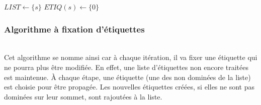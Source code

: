 \documentclass[10pt,francais]{llncs}
\begin{document}
\begin{algorithm}\label{algo-correction}
\caption{CORRECTION~: Algorithme \`a correction d'\'etiquettes}
\BlankLine
{}
\BlankLine


$LIST \leftarrow \{s\}$\;
$ETIQ(s) \leftarrow \{0\}$

\end{algorithm}

\subsubsection{Algorithme \`a fixation d'\'etiquettes \cite{Desrosiers1983}}\label{subsub-resol-progdyn-fix}
~\\
Cet algorithme se nomme ainsi car \`a chaque it\'eration, il va fixer une \'etiquette qui ne pourra plus \^etre modifi\'ee. En effet, une liste d'\'etiquettes non encore trait\'ees est maintenue. \`A chaque \'etape, une \'etiquette (une des non domin\'ees de la liste) est choisie pour \^etre propag\'ee. Les nouvelles \'etiquettes cr\'e\'ees, si elles ne sont pas domin\'ees sur leur sommet, sont rajout\'ees \`a la liste.
\end{document}
